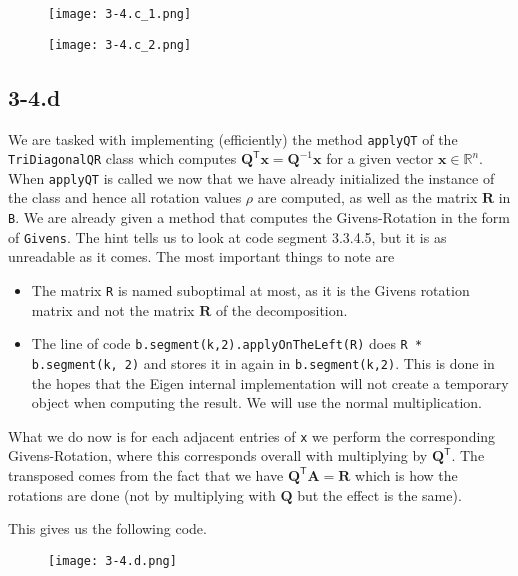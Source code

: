 \documentclass{article}
\begin{document}
\begin{figure}[!hbt]
    \centering
\texttt{[image: 3-4.c\_1.png]}
\end{figure}

\pagebreak 

\begin{figure}[!hbt]
    \centering
\texttt{[image: 3-4.c\_2.png]}
\end{figure}

\subsection*{3-4.d}
We are tasked with implementing (efficiently) the method \verb|applyQT| of the \verb|TriDiagonalQR| class which computes $\mathbf{Q}^{\mathsf{T}}\mathbf{x} = \mathbf{Q}^{-1}\mathbf{x}$ for a given vector $\mathbf{x}\in \mathbb{R}^{n}$. When \verb|applyQT| is called we now that we have already initialized the instance of the class and hence all rotation values $\rho$ are computed, as well as the matrix $\mathbf{R}$ in \verb|B|. We are already given a method that computes the Givens-Rotation in the form of \verb|Givens|. The hint tells us to look at code segment 3.3.4.5, but it is as unreadable as it comes. The most important things to note are
\begin{itemize}
    \item The matrix \verb|R| is named suboptimal at most, as it is the Givens rotation matrix and not the matrix $\mathbf{R}$ of the decomposition.
    \item The line of code \verb|b.segment(k,2).applyOnTheLeft(R)| does \verb|R * b.segment(k, 2)| and stores it in again in \verb|b.segment(k,2)|. This is done in the hopes that the Eigen internal implementation will not create a temporary object when computing the result. We will use the normal multiplication.
\end{itemize}
What we do now is for each adjacent entries of \verb|x| we perform the corresponding Givens-Rotation, where this corresponds overall with multiplying by $\mathbf{Q}^{\mathsf{T}}$. The transposed comes from the fact that  we have $\mathbf{Q}^{\mathsf{T}}\mathbf{A}= \mathbf{R}$ which is how the rotations are done (not by multiplying with $\mathbf{Q}$ but the effect is the same). 

\pagebreak

\noindent This gives us the following code.
\begin{figure}[!hbt]
    \centering
\texttt{[image: 3-4.d.png]}
\end{figure}
\end{document}
